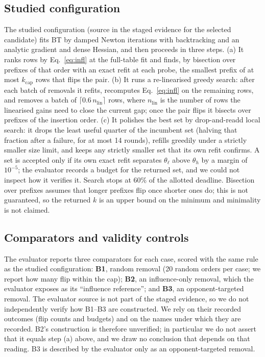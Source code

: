 \documentclass{article}
\newcommand{\kcap}{k_{\mathrm{cap}}}
\newcommand{\hi}{h}
\newcommand{\lo}{\ell}
\begin{document}
\subsection{Studied configuration}
The studied configuration (source in the staged evidence for the selected candidate) fits BT by damped Newton iterations with backtracking and an analytic gradient and dense Hessian, and then proceeds in three steps. (a) It ranks rows by Eq.~\eqref{eq:infl} at the full-table fit and finds, by bisection over prefixes of that order with an exact refit at each probe, the smallest prefix of at most $\kcap$ rows that flips the pair. (b) It runs a re-linearised greedy search: after each batch of removals it refits, recomputes Eq.~\eqref{eq:infl} on the remaining rows, and removes a batch of $\lceil 0.6\,n_{\mathrm{lin}}\rceil$ rows, where $n_{\mathrm{lin}}$ is the number of rows the linearised gains need to close the current gap; once the pair flips it bisects over prefixes of the insertion order. (c) It polishes the best set by drop-and-readd local search: it drops the least useful quarter of the incumbent set (halving that fraction after a failure, for at most 14 rounds), refills greedily under a strictly smaller size limit, and keeps any strictly smaller set that its own refit confirms. A set is accepted only if its own exact refit separates $\theta_{\lo}$ above $\theta_{\hi}$ by a margin of $10^{-5}$; the evaluator records a budget for the returned set, and we could not inspect how it verifies it. Search stops at 60\% of the allotted deadline. Bisection over prefixes assumes that longer prefixes flip once shorter ones do; this is not guaranteed, so the returned $k$ is an upper bound on the minimum and minimality is not claimed.

\subsection{Comparators and validity controls}\label{sec:method_comp}
The evaluator reports three comparators for each case, scored with the same rule as the studied configuration: \textbf{B1}, random removal (20 random orders per case; we report how many flip within the cap); \textbf{B2}, an influence-only removal, which the evaluator exposes as its ``influence reference''; and \textbf{B3}, an opponent-targeted removal. The evaluator source is not part of the staged evidence, so we do not independently verify how B1--B3 are constructed. We rely on their recorded outcomes (flip counts and budgets) and on the names under which they are recorded. B2's construction is therefore unverified; in particular we do not assert that it equals step (a) above, and we draw no conclusion that depends on that reading. B3 is described by the evaluator only as an opponent-targeted removal.
\end{document}
